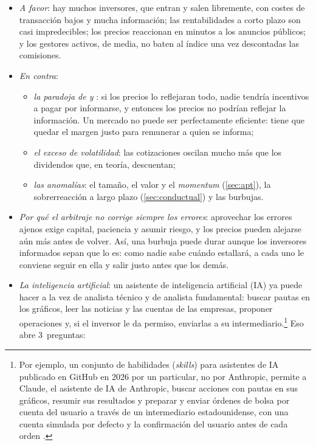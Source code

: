 \documentclass[11pt]{article}
\begin{document}
\begin{itemize}
\item \emph{A favor}: hay muchos inversores, que entran y salen libremente, con costes de transacción bajos y mucha información; las rentabilidades a corto plazo son casi impredecibles; los precios reaccionan en minutos a los anuncios públicos; y los gestores activos, de media, no baten al índice una vez descontadas las comisiones\nocite{Jensen1968Performance}.
\item \emph{En contra}:
  \begin{itemize}
  \item \emph{la paradoja de  y }: si los precios lo reflejaran todo, nadie tendría incentivos a pagar por informarse, y entonces los precios no podrían reflejar la información. Un mercado no puede ser perfectamente eficiente: tiene que quedar el margen justo para remunerar a quien se informa\nocite{GrossmanStiglitz1980};
  \item \emph{el exceso de volatilidad}: las cotizaciones oscilan mucho más que los dividendos que, en teoría, descuentan\nocite{Shiller1981Move};
  \item \emph{las anomalías}: el tamaño, el valor y el \emph{momentum} (\ref{sec:apt}), la sobrerreacción a largo plazo (\ref{sec:conductual}) y las burbujas.
  \end{itemize}
\item \emph{Por qué el arbitraje no corrige siempre los errores}: aprovechar los errores ajenos exige capital, paciencia y asumir riesgo, y los precios pueden alejarse aún más antes de volver\nocite{ShleiferVishny1997Limits}. Así, una burbuja puede durar aunque los inversores informados sepan que lo es: como nadie sabe cuándo estallará, a cada uno le conviene seguir en ella y salir justo antes que los demás\nocite{AbreuBrunnermeier2003}.
\item \emph{La inteligencia artificial}: un asistente de inteligencia artificial (IA) ya puede hacer a la vez de analista técnico y de analista fundamental: buscar pautas en los gráficos, leer las noticias y las cuentas de las empresas, proponer operaciones y, si el inversor le da permiso, enviarlas a su intermediario.\footnote{Por ejemplo, un conjunto de habilidades (\emph{skills}) para asistentes de IA publicado en GitHub en 2026 por un particular, no por Anthropic, permite a Claude, el asistente de IA de Anthropic, buscar acciones con pautas en sus gráficos, resumir sus resultados y preparar y enviar órdenes de bolsa por cuenta del usuario a través de un intermediario estadounidense, con una cuenta simulada por defecto y la confirmación del usuario antes de cada orden \parencite{Schincariol2026DayTrader}.} Eso abre 3~preguntas:

\end{itemize}
\end{document}
